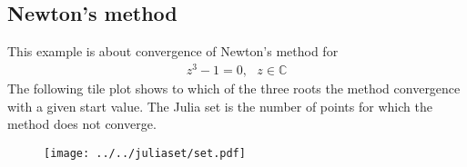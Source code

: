 \documentclass[a4paper]{article}
\begin{document}
\subsection{Newton's method}

This example is about convergence of Newton's method for 
\begin{align}
  z^3 - 1 = 0, \text{  } z \in \mathbb{C}
\end{align}
The following tile plot shows to which of the three roots the method convergence with a given start value. 
The Julia set is the number of points for which the method does not converge. 

\begin{figure}[h]
  \centering
  \texttt{[image: ../../juliaset/set.pdf]}
\end{figure}
\end{document}
